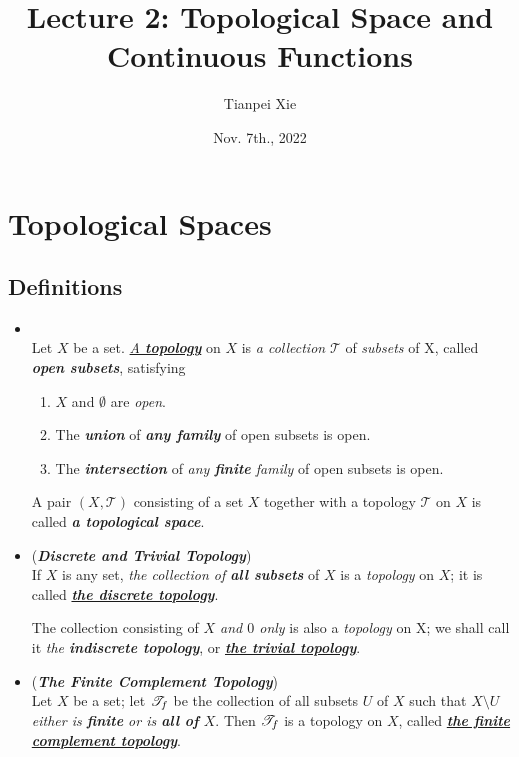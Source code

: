 \documentclass[11pt]{article}
\begin{document}
\title{Lecture 2: Topological Space and Continuous Functions}
\author{ Tianpei Xie}
\date{Nov. 7th., 2022}
\maketitle
\tableofcontents
\newpage
\section{Topological Spaces}
\subsection{Definitions}
\begin{itemize}
\item 
\begin{definition} \citep{munkres2000topology}\\
Let $X$ be a set. \underline{\emph{A \textbf{topology}}} on $X$ is \emph{a collection} $\mathscr{T}$ of \emph{subsets} of X, called \emph{\textbf{open subsets}}, satisfying
\begin{enumerate}
\item $X$ and $\emptyset$ are \emph{open}.
\item The \emph{\textbf{union}} of \emph{\textbf{any family}} of open subsets is open.
\item The \emph{\textbf{intersection}} of \emph{any \textbf{finite} family} of open subsets is open.
\end{enumerate}
A pair $(X, \mathscr{T})$ consisting of a set $X$ together with a topology $\mathscr{T}$ on $X$ is called \emph{\textbf{a topological space}}.
\end{definition}

\item \begin{example}(\emph{\textbf{Discrete and Trivial Topology}})\\
If $X$ is any set, \emph{the collection of \textbf{all subsets}} of $X$ is a \emph{topology} on $X$; it is called \underline{\emph{\textbf{the discrete topology}}}. 

The collection consisting of \emph{$X$ and $0$ only} is also a \emph{topology} on X; we shall call it \emph{the \textbf{indiscrete topology}}, or \underline{\emph{\textbf{the trivial topology}}}.
\end{example}

\item \begin{example} (\emph{\textbf{The Finite Complement Topology}})\\
Let $X$ be a set; let ${\mathscr T}_{f}$ be the collection of all subsets $U$ of $X$ such that \emph{$X \setminus U$ either is \textbf{finite} or is \textbf{all of} $X$}. Then ${\mathscr T}_f$ is a topology on $X$, called \underline{\emph{\textbf{the finite complement topology}}}. 


\end{example}
\end{itemize}
\end{document}
